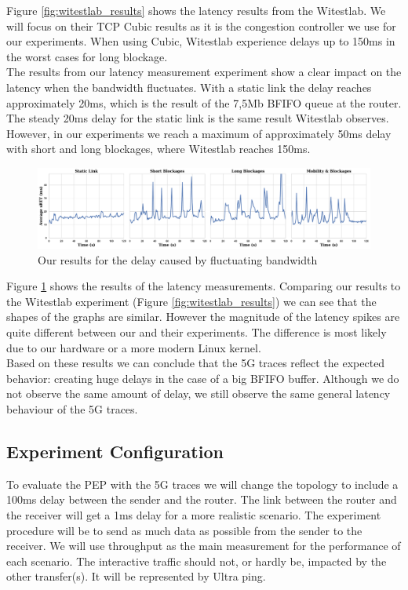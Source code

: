 \documentclass[a4paper,english, 11pt]{report}
\begin{document}
Figure \ref{fig:witestlab_results} shows the latency results from the Witestlab. We will focus on their TCP Cubic results as it is the congestion controller we use for our experiments. When using Cubic, Witestlab experience delays up to 150ms in the worst cases for long blockage.\\

The results from our latency measurement experiment show a clear impact on the latency when the bandwidth fluctuates. With a static link the delay reaches approximately 20ms, which is the result of the 7,5Mb BFIFO queue at the router. The steady 20ms delay for the static link is the same result Witestlab observes. However, in our experiments we reach a maximum of approximately 50ms delay with short and long blockages, where Witestlab reaches 150ms.\\

\begin{figure}[h!] %
	\centering
	\includegraphics[scale=0.25]{../diagrams/witestlab/combined_plots.pdf}
  	\caption{Our results for the delay caused by fluctuating bandwidth}
  	\label{fig:witestlab_graph_delay_1}
\end{figure}

Figure \ref{fig:witestlab_graph_delay_1} shows the results of the latency measurements. Comparing our results to the Witestlab experiment (Figure \ref{fig:witestlab_results}) we can see that the shapes of the graphs are similar. However the magnitude of the latency spikes are quite different between our and their experiments. The difference is most likely due to our hardware or a more modern Linux kernel.\\

Based on these results we can conclude that the 5G traces reflect the expected behavior: creating huge delays in the case of a big BFIFO buffer. Although we do not observe the same amount of delay, we still observe the same general latency behaviour of the 5G traces.

\subsection{Experiment Configuration}
To evaluate the PEP with the 5G traces we will change the topology to include a 100ms delay between the sender and the router. The link between the router and the receiver will get a 1ms delay for a more realistic scenario. The experiment procedure will be to send as much data as possible from the sender to the receiver. We will use throughput as the main measurement for the performance of each scenario. The interactive traffic should not, or hardly be, impacted by the other transfer(s). It will be represented by Ultra ping.
\end{document}
